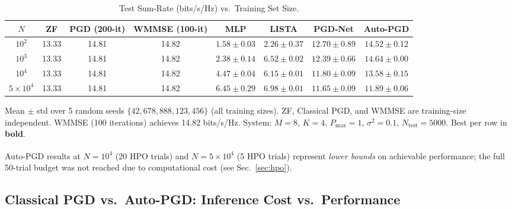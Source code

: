 \documentclass[conference,11pt]{IEEEtran}
\begin{document}
\begin{table}[b]
\caption{Test Sum-Rate (bits/s/Hz) vs.\ Training Set Size.}
\label{tab:sum_rate}
\begin{center}
\begin{threeparttable}
\begin{tabular}{c c c c c c c c}
\toprule
$N$ & ZF & PGD (200-it) & WMMSE (100-it) & MLP & LISTA & PGD-Net & Auto-PGD \\
\midrule
$10^2$        & 13.33 & 14.81 & 14.82 & $1.58{\pm}0.03$ & $2.26{\pm}0.37$ & $12.70{\pm}0.89$ & $\mathbf{14.52}{\pm}0.12$ \\
$10^3$        & 13.33 & 14.81 & 14.82 & $2.38{\pm}0.14$ & $6.52{\pm}0.02$ & $12.39{\pm}0.66$ & $\mathbf{14.64}{\pm}0.00$ \\
$10^4$        & 13.33 & 14.81 & 14.82 & $4.47{\pm}0.04$ & $6.15{\pm}0.01$ & $11.80{\pm}0.09$ & $\mathbf{13.58}{\pm}0.15$ \\
$5\times10^4$ & 13.33 & 14.81 & 14.82 & $6.45{\pm}0.29$ & $6.98{\pm}0.01$ & $11.65{\pm}0.09$ & $\mathbf{11.89}{\pm}0.06$ \\
\bottomrule
\end{tabular}
\begin{tablenotes}
\small
\item Mean $\pm$ std over 5 random seeds $\{42,678,888,123,456\}$ (all training sizes). ZF, Classical PGD, and WMMSE are training-size independent. WMMSE \cite{shi2011wmmse} (100 iterations) achieves 14.82 bits/s/Hz. System: $M{=}8$, $K{=}4$, $P_{\max}{=}1$, $\sigma^2{=}0.1$, $N_{\text{test}}{=}5000$. Best per row in \textbf{bold}.
\item \textsuperscript{\dag} Auto-PGD results at $N{=}10^4$ (20 HPO trials) and $N{=}5\!\times\!10^4$ (5 HPO trials) represent \emph{lower bounds} on achievable performance; the full 50-trial budget was not reached due to computational cost (see Sec.~\ref{sec:hpo}).
\end{tablenotes}
\end{threeparttable}
\end{center}
\end{table}

\subsection{Classical PGD vs.\ Auto-PGD: Inference Cost vs.\ Performance}
\end{document}
